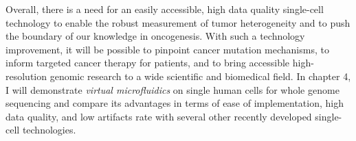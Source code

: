 Overall, there is a need for an easily accessible, high data quality single-cell technology to enable the robust measurement of tumor heterogeneity and to push the boundary of our knowledge in oncogenesis. With such a technology improvement, it will be possible to pinpoint cancer mutation mechanisms, to inform targeted cancer therapy for patients, and to bring accessible high-resolution genomic research to a wide scientific and biomedical field. In chapter 4, I will demonstrate \textit{virtual microfluidics} on single human cells for whole genome sequencing and compare its advantages in terms of ease of implementation, high data quality, and low artifacts rate with several other recently developed single-cell technologies. 

